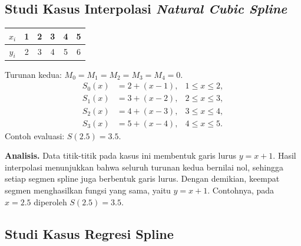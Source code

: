 \subsection{Studi Kasus Interpolasi \textit{Natural Cubic Spline}}

\begin{kasus}
\begin{center}
\begin{tabular}{c|ccccc}
$x_i$ & 1 & 2 & 3 & 4 & 5 \\ \hline
$y_i$ & 2 & 3 & 4 & 5 & 6
\end{tabular}
\end{center}
Turunan kedua: $M_0 = M_1 = M_2 = M_3 = M_4 = 0$.
\begin{align*}
S_0(x) &= 2 + (x - 1), & 1 \le x \le 2, \\
S_1(x) &= 3 + (x - 2), & 2 \le x \le 3, \\
S_2(x) &= 4 + (x - 3), & 3 \le x \le 4, \\
S_3(x) &= 5 + (x - 4), & 4 \le x \le 5 .
\end{align*}
Contoh evaluasi: $S(2.5) = 3.5$.

\end{kasus}

\textbf{Analisis.} Data titik-titik pada kasus ini membentuk garis lurus $y = x + 1$. 
Hasil interpolasi menunjukkan bahwa seluruh turunan kedua bernilai nol, 
sehingga setiap segmen spline juga berbentuk garis lurus. 
Dengan demikian, keempat segmen menghasilkan fungsi yang sama, yaitu 
$y = x + 1$. Contohnya, pada $x = 2.5$ diperoleh $S(2.5) = 3.5$.

\subsection{Studi Kasus Regresi Spline}

